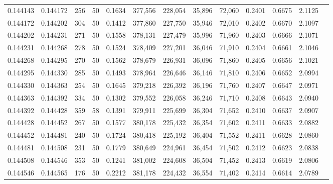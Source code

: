 \begin{tabular}{rrrrrrrrrrrrr}
0.144143 & 0.144172 &   256 &  50 &                                     0.1634 & 377,556 & 228,054 &  35,896 &  72,060 & 0.2401 & 0.6675 & 2.1125 \\
0.144172 & 0.144202 &   304 &  50 &                                     0.1412 & 377,860 & 227,750 &  35,946 &  72,010 & 0.2402 & 0.6670 & 2.1097 \\
0.144202 & 0.144231 &   271 &  50 &                                     0.1558 & 378,131 & 227,479 &  35,996 &  71,960 & 0.2403 & 0.6666 & 2.1071 \\
0.144231 & 0.144268 &   278 &  50 &                                     0.1524 & 378,409 & 227,201 &  36,046 &  71,910 & 0.2404 & 0.6661 & 2.1046 \\
0.144268 & 0.144295 &   270 &  50 &                                     0.1562 & 378,679 & 226,931 &  36,096 &  71,860 & 0.2405 & 0.6656 & 2.1021 \\
0.144295 & 0.144330 &   285 &  50 &                                     0.1493 & 378,964 & 226,646 &  36,146 &  71,810 & 0.2406 & 0.6652 & 2.0994 \\
0.144330 & 0.144363 &   254 &  50 &                                     0.1645 & 379,218 & 226,392 &  36,196 &  71,760 & 0.2407 & 0.6647 & 2.0971 \\
0.144363 & 0.144392 &   334 &  50 &                                     0.1302 & 379,552 & 226,058 &  36,246 &  71,710 & 0.2408 & 0.6643 & 2.0940 \\
0.144392 & 0.144428 &   359 &  58 &                                     0.1391 & 379,911 & 225,699 &  36,304 &  71,652 & 0.2410 & 0.6637 & 2.0907 \\
0.144428 & 0.144452 &   267 &  50 &                                     0.1577 & 380,178 & 225,432 &  36,354 &  71,602 & 0.2411 & 0.6633 & 2.0882 \\
0.144452 & 0.144481 &   240 &  50 &                                     0.1724 & 380,418 & 225,192 &  36,404 &  71,552 & 0.2411 & 0.6628 & 2.0860 \\
0.144481 & 0.144508 &   231 &  50 &                                     0.1779 & 380,649 & 224,961 &  36,454 &  71,502 & 0.2412 & 0.6623 & 2.0838 \\
0.144508 & 0.144546 &   353 &  50 &                                     0.1241 & 381,002 & 224,608 &  36,504 &  71,452 & 0.2413 & 0.6619 & 2.0806 \\
0.144546 & 0.144565 &   176 &  50 &                                     0.2212 & 381,178 & 224,432 &  36,554 &  71,402 & 0.2414 & 0.6614 & 2.0789 \\

\end{tabular}
